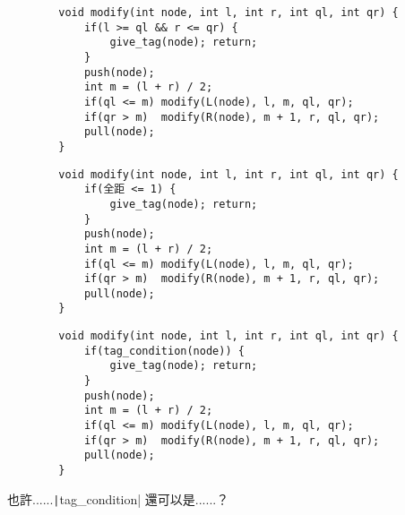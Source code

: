 \begin{frame}[fragile]{\ebtitle}
    \begin{verbatim}
        void modify(int node, int l, int r, int ql, int qr) {
            if(l >= ql && r <= qr) {
                give_tag(node); return;
            }
            push(node);
            int m = (l + r) / 2;
            if(ql <= m) modify(L(node), l, m, ql, qr);
            if(qr > m)  modify(R(node), m + 1, r, ql, qr);
            pull(node);
        }
    \end{verbatim}
\end{frame}

\begin{frame}[fragile]{\ebtitle}
    \begin{verbatim}
        void modify(int node, int l, int r, int ql, int qr) {
            if(全距 <= 1) {
                give_tag(node); return;
            }
            push(node);
            int m = (l + r) / 2;
            if(ql <= m) modify(L(node), l, m, ql, qr);
            if(qr > m)  modify(R(node), m + 1, r, ql, qr);
            pull(node);
        }
    \end{verbatim}
\end{frame}

\begin{frame}[fragile]{\ebtitle}
    \begin{verbatim}
        void modify(int node, int l, int r, int ql, int qr) {
            if(tag_condition(node)) {
                give_tag(node); return;
            }
            push(node);
            int m = (l + r) / 2;
            if(ql <= m) modify(L(node), l, m, ql, qr);
            if(qr > m)  modify(R(node), m + 1, r, ql, qr);
            pull(node);
        }
    \end{verbatim}
\end{frame}

\begin{frame}{\ebtitle}
    也許......\texttt|tag_condition| 還可以是......？
\end{frame}

